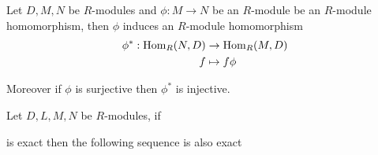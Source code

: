 \begin{proposition}
	Let $D, M, N$ be $R$-modules and $\phi: M \to N$ be an $R$-module be an $R$-module homomorphism, then $\phi$ induces an $R$-module homomorphism
	\begin{align*}
		\phi^*: \operatorname{Hom}_R(N, D) &\to \operatorname{Hom}_R(M, D) \\
		f &\mapsto f \phi
	\end{align*}
	
	Moreover if $\phi$ is surjective then $\phi^*$ is injective.
\end{proposition}

\begin{theorem}
	Let $D, L, M, N$ be $R$-modules, if
	\begin{center}
	\end{center}
	
	is exact then the following sequence is also exact
	\begin{center}
	\end{center}
\end{theorem}


